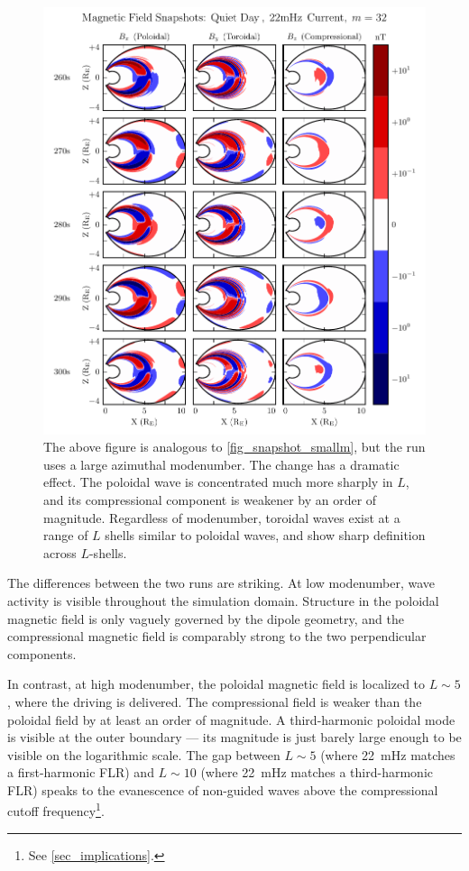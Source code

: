 \begin{figure}[!htb]
  \centering
  \includegraphics[width=\textwidth]{figures/snapshot_bigm.pdf}
  \caption[Magnetic Field Snapshots from a Large-\azm Run]{
    The above figure is analogous to \cref{fig_snapshot_smallm}, but the run
    uses a large azimuthal modenumber. The change has a dramatic effect. The
    poloidal wave is concentrated much more sharply in $L$, and its
    compressional component is weakener by an order of magnitude. Regardless of
    modenumber, toroidal waves exist at a range of $L$ shells similar to
    poloidal waves, and show sharp definition across $L$-shells. 
  }
  \label{fig_snapshot_bigm}
\end{figure}

The differences between the two runs are striking. At low modenumber, wave
activity is visible throughout the simulation domain. Structure in the poloidal
magnetic field is only vaguely governed by the dipole geometry, and the
compressional magnetic field is comparably strong to the two perpendicular
components. 

In contrast, at high modenumber, the poloidal magnetic field is localized to
$L \sim 5$, where the driving is delivered. The compressional field is weaker
than the poloidal field by at least an order of magnitude. A third-harmonic
poloidal mode is visible at the outer boundary --- its magnitude is just barely
large enough to be visible on the logarithmic scale. The gap between $L\sim5$
(where \SI{22}{\mHz} matches a first-harmonic FLR) and $L\sim10$ (where
\SI{22}{\mHz} matches a third-harmonic FLR) speaks to the evanescence of
non-guided waves above the compressional \Alfven cutoff frequency\footnote{See
\cref{sec_implications}. }. 

